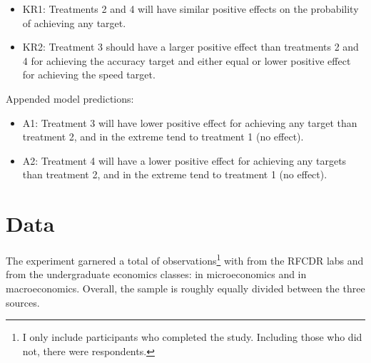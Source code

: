 \documentclass[12pt, letterpaper, DIV=11, numbers=noendperiod]{article}
\providecommand{\tightlist}{\setlength{\itemsep}{0pt}\setlength{\parskip}{0pt}}
\begin{document}
\begin{itemize}
\tightlist
\item
  KR1: Treatments 2 and 4 will have similar positive effects on the probability of achieving any target.
\item
  KR2: Treatment 3 should have a larger positive effect than treatments 2 and 4 for achieving the accuracy target and either equal or lower positive effect for achieving the speed target.
\end{itemize}

\noindent Appended model predictions:

\begin{itemize}
\tightlist
\item
  A1: Treatment 3 will have lower positive effect for achieving any target than treatment 2, and in the extreme tend to treatment 1 (no effect).
\item
  A2: Treatment 4 will have a lower positive effect for achieving any targets than treatment 2, and in the extreme tend to treatment 1 (no effect).
\end{itemize}

\section{Data}\label{data}

The experiment garnered a total of \NumObs{} observations\footnote{I only include participants who completed the study. Including those who did not, there were \NumRespondents{} respondents.} with \NumObsLab{} from the RFCDR labs and \NumObsClass{} from the undergraduate economics classes: \NumObsMicro{} in microeconomics and \NumObsMacro{} in macroeconomics. Overall, the sample is roughly equally divided between the three sources.

\begin{table}
\centering
{\par}
\caption{Covariate balance for lab sample}\label{tbl-covariates-sumstats-lab}
\end{table}

\begin{table}
\centering
{\par}
\caption{Covariate balance for microeconomic class sample}\label{tbl-covariates-sumstats-micro}
\end{table}

\begin{table}
\centering
{\par}
\caption{Covariate balance for macroeconomic class sample}\label{tbl-covariates-sumstats-macro}
\end{table}
\end{document}
